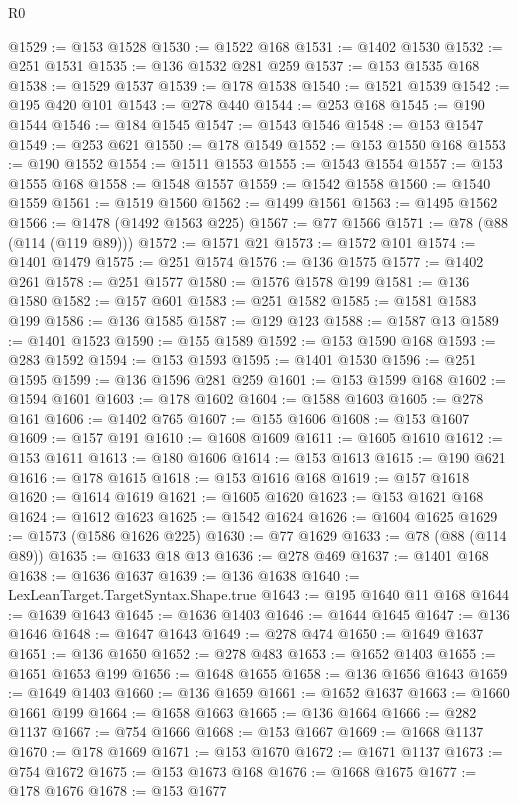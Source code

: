 \begin{lexlean}{R0}
\begin{coremodule}
@1529 := @153 @1528
@1530 := @1522 @168
@1531 := @1402 @1530
@1532 := @251 @1531
@1535 := @136 @1532 @281 @259
@1537 := @153 @1535 @168
@1538 := @1529 @1537
@1539 := @178 @1538
@1540 := @1521 @1539
@1542 := @195 @420 @101
@1543 := @278 @440
@1544 := @253 @168
@1545 := @190 @1544
@1546 := @184 @1545
@1547 := @1543 @1546
@1548 := @153 @1547
@1549 := @253 @621
@1550 := @178 @1549
@1552 := @153 @1550 @168
@1553 := @190 @1552
@1554 := @1511 @1553
@1555 := @1543 @1554
@1557 := @153 @1555 @168
@1558 := @1548 @1557
@1559 := @1542 @1558
@1560 := @1540 @1559
@1561 := @1519 @1560
@1562 := @1499 @1561
@1563 := @1495 @1562
@1566 := @1478 (@1492 @1563 @225)
@1567 := @77 @1566
@1571 := @78 (@88 (@114 (@119 @89)))
@1572 := @1571 @21
@1573 := @1572 @101
@1574 := @1401 @1479
@1575 := @251 @1574
@1576 := @136 @1575
@1577 := @1402 @261
@1578 := @251 @1577
@1580 := @1576 @1578 @199
@1581 := @136 @1580
@1582 := @157 @601
@1583 := @251 @1582
@1585 := @1581 @1583 @199
@1586 := @136 @1585
@1587 := @129 @123
@1588 := @1587 @13
@1589 := @1401 @1523
@1590 := @155 @1589
@1592 := @153 @1590 @168
@1593 := @283 @1592
@1594 := @153 @1593
@1595 := @1401 @1530
@1596 := @251 @1595
@1599 := @136 @1596 @281 @259
@1601 := @153 @1599 @168
@1602 := @1594 @1601
@1603 := @178 @1602
@1604 := @1588 @1603
@1605 := @278 @161
@1606 := @1402 @765
@1607 := @155 @1606
@1608 := @153 @1607
@1609 := @157 @191
@1610 := @1608 @1609
@1611 := @1605 @1610
@1612 := @153 @1611
@1613 := @180 @1606
@1614 := @153 @1613
@1615 := @190 @621
@1616 := @178 @1615
@1618 := @153 @1616 @168
@1619 := @157 @1618
@1620 := @1614 @1619
@1621 := @1605 @1620
@1623 := @153 @1621 @168
@1624 := @1612 @1623
@1625 := @1542 @1624
@1626 := @1604 @1625
@1629 := @1573 (@1586 @1626 @225)
@1630 := @77 @1629
@1633 := @78 (@88 (@114 @89))
@1635 := @1633 @18 @13
@1636 := @278 @469
@1637 := @1401 @168
@1638 := @1636 @1637
@1639 := @136 @1638
@1640 := LexLeanTarget.TargetSyntax.Shape.true
@1643 := @195 @1640 @11 @168
@1644 := @1639 @1643
@1645 := @1636 @1403
@1646 := @1644 @1645
@1647 := @136 @1646
@1648 := @1647 @1643
@1649 := @278 @474
@1650 := @1649 @1637
@1651 := @136 @1650
@1652 := @278 @483
@1653 := @1652 @1403
@1655 := @1651 @1653 @199
@1656 := @1648 @1655
@1658 := @136 @1656 @1643
@1659 := @1649 @1403
@1660 := @136 @1659
@1661 := @1652 @1637
@1663 := @1660 @1661 @199
@1664 := @1658 @1663
@1665 := @136 @1664
@1666 := @282 @1137
@1667 := @754 @1666
@1668 := @153 @1667
@1669 := @1668 @1137
@1670 := @178 @1669
@1671 := @153 @1670
@1672 := @1671 @1137
@1673 := @754 @1672
@1675 := @153 @1673 @168
@1676 := @1668 @1675
@1677 := @178 @1676
@1678 := @153 @1677

\end{coremodule}
\end{lexlean}
